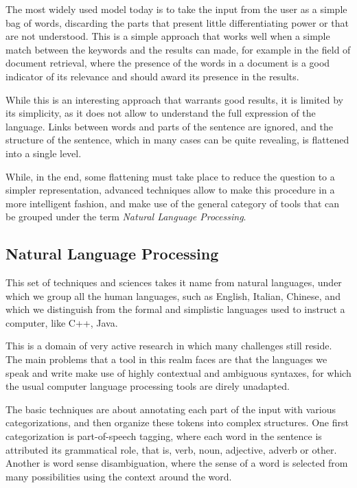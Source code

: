The most widely used model today is to take the input from the user as a simple bag of words, discarding the parts that present little differentiating power or that are not understood. This is a simple approach that works well when a simple match between the keywords and the results can made, for example in the field of document retrieval, where the presence of the words in a document is a good indicator of its relevance and should award its presence in the results.

While this is an interesting approach that warrants good results, it is limited by its simplicity, as it does not allow to understand the full expression of the language. Links between words and parts of the sentence are ignored, and the structure of the sentence, which in many cases can be quite revealing, is flattened into a single level.

While, in the end, some flattening must take place to reduce the question to a simpler representation, advanced techniques allow to make this procedure in a more intelligent fashion, and make use of the general category of tools that can be grouped under the term \emph{Natural Language Processing}.

\subsection{Natural Language Processing} %
\label{sub:natural_language_processing}

This set of techniques and sciences takes it name from natural languages, under which we group all the human languages, such as English, Italian, Chinese, and which we distinguish from the formal and simplistic languages used to instruct a computer, like C++, Java.

This is a domain of very active research in which many challenges still reside. The main problems that a tool in this realm faces are that the languages we speak and write make use of highly contextual and ambiguous syntaxes, for which the usual computer language processing tools are direly unadapted.

The basic techniques are about annotating each part of the input with various categorizations, and then organize these tokens into complex structures. One first categorization is part-of-speech tagging, where each word in the sentence is attributed its grammatical role, that is, verb, noun, adjective, adverb or other. Another is word sense disambiguation, where the sense of a word is selected from many possibilities using the context around the word.

